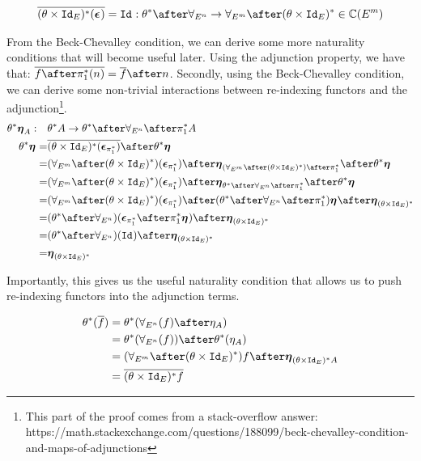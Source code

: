 \documentclass{Report}
\begin{document}
\begin{align*}
    \bar{(\theta\times\Id{E})\star(\counit{})} = \Id{}: \theta\star\after\allEn \rightarrow \allEm\after(\theta\times\Id{E})\star\in \C(E^m)
\end{align*}

From the Beck-Chevalley condition, we can derive some more naturality conditions that will become useful later.
Using the adjunction property, we have that: $\bar{f\after\pstar(n)} = \bar{f}\after n$. Secondly, using the Beck-Chevalley condition, we can derive some non-trivial interactions between re-indexing functors and the adjunction\footnote{This part of the proof comes from a stack-overflow answer: https://math.stackexchange.com/questions/188099/beck-chevalley-condition-and-maps-of-adjunctions}. 
    \begin{align*}
        \theta\star\unit{A}:\quad&\theta\star A \rightarrow \theta\star\after\allEn\after\pstar A\\
        \theta\star\unit{} =& \bar{(\theta\times\Id{E})\star(\counit{\pstar})}\after\theta\star\unit{}\\
        =& (\allEm\after(\theta\times\Id{E})\star)(\counit{\pstar})\after\unit{(\allEm\after(\theta\times\Id{E})\star)\after\pstar}\after\theta\star\unit{}\\
        = & (\allEm\after(\theta\times\Id{E})\star)(\counit{\pstar})\after\unit{\theta\star\after\allEn\after\pstar}\after\theta\star\unit{}\\
        = & (\allEm\after(\theta\times\Id{E})\star)(\counit{\pstar}) \after(\theta\star\after\allEn\after\pstar)\unit{} \after\unit{(\theta\times\Id{E})\star}\\
        = & (\theta\star\after\allEn)(\counit{\pstar}
        \after\pstar\unit{})\after\unit{(\theta\times\Id{E})\star}\\
        = & (\theta\star\after\allEn)(\Id{})\after\unit{(\theta\times\Id{E})\star}\\
        = & \unit{(\theta\times\Id{E})\star}
    \end{align*}

    Importantly, this gives us the useful naturality condition that allows us to push re-indexing functors into the adjunction terms.

    \begin{align}\label{NaturalityCondition}
        \theta\star(\bar{f}) & = \theta\star(\allEn(f)\after\eta_A)\\
        & = \theta\star(\allEn(f))\after\theta\star(\eta_A)\\
        & =  (\allEm\after(\theta\times\Id{E})\star)f \after\unit{(\theta\times\Id{E})\star A}\\
        & = \bar{(\theta\times\Id{E})\star f}\\
    \end{align}
\end{document}
